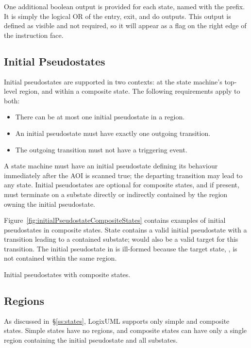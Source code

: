 One additional boolean output is provided for each state, named with the
 prefix. It is simply the logical OR of the
entry, exit, and do outputs. This output is defined as visible and not
required, so it will appear as a flag on the right edge of the
instruction face.


\subsection{Initial Pseudostates}

Initial pseudostates are supported in two contexts: at the state machine's
top-level region, and within a composite state. The following requirements
apply to both:

\begin{itemize}
  \item There can be at most one initial pseudostate in a region.

  \item An initial pseudostate must have exactly one outgoing transition.

  \item The outgoing transition must not have a triggering event.
\end{itemize}

A state machine must have an initial pseudostate defining its behaviour
immediately after the AOI is scanned true; the departing transition may lead
to any state. Initial pseudostates are optional for composite states,
and if present, must terminate on a substate directly or indirectly contained
by the region owning the initial pseudostate.

Figure~\ref{fig:initialPseudostateCompositeStates} contains examples of
initial pseudostates in composite states. State 
contains a valid initial pseudostate with a transition leading to
a contained substate;  would also be a valid target
for this transition. The initial pseudostate in  is
ill-formed because the target state, , is not contained within
the same region.

               {Initial pseudostates with composite states.}


\subsection{Regions}

As discussed in~\S\ref{ss:states}, LogixUML supports only simple and
composite states. Simple states have no regions, and composite states
can have only a single region containing the initial pseudostate and
all substates.

